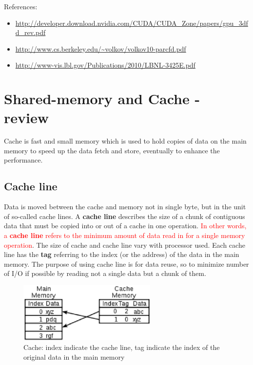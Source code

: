 References:
\begin{itemize}
\item
  \url{http://developer.download.nvidia.com/CUDA/CUDA_Zone/papers/gpu_3dfd_rev.pdf} 
\item \url{http://www.cs.berkeley.edu/~volkov/volkov10-parcfd.pdf}
\item \url{http://www-vis.lbl.gov/Publications/2010/LBNL-3425E.pdf}
\end{itemize}

\section{Shared-memory and Cache - review}
\label{sec:cache-review}

Cache is fast and small memory which is used to hold copies of data on the main
memory to speed up the data fetch and store, eventually to enhance the
performance.

\subsection{Cache line}

Data is moved between the cache and memory not in single byte, but in the unit
of so-called cache lines. A {\bf cache line} describes the size of a chunk of
contiguous data that must be copied into or out of a cache in one operation.
\textcolor{red}{In other words, a {\bf cache line} refers to the minimum amount
of data read in for a single memory operation}. The size of cache and cache line
vary with processor used. Each cache line has the {\bf tag} referring to the
index (or the address) of the data in the main memory. The purpose of using
cache line is for data reuse, so to minimize number of I/O if possible by
reading not a single data but a chunk of them.


\begin{figure}[hbt]
  \centerline{\includegraphics[height=3cm,
    angle=0]{./images/cache.eps}}
  \caption{Cache: index indicate the cache line, tag indicate the
    index of the original data in the main memory}
  \label{fig:cache}
\end{figure}

